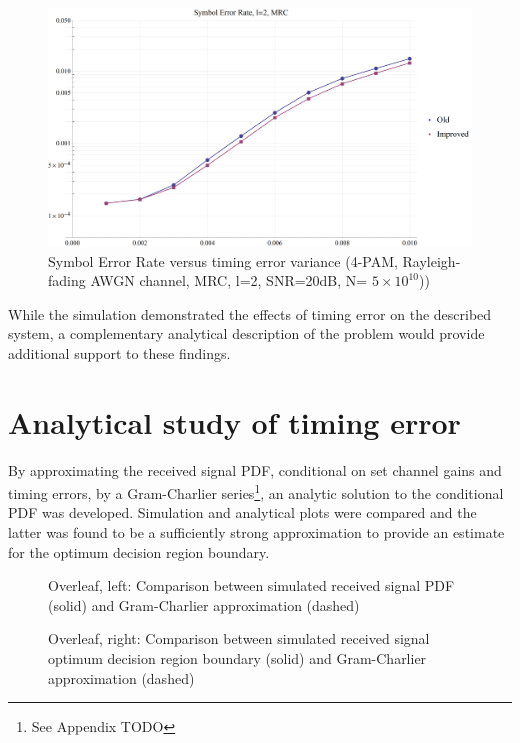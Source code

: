 \begin{figure}[htbp]
\centering
\includegraphics[width=\linewidth]{MRC2_SER.png}
\caption[MRC Symbol Error Rate]{Symbol Error Rate versus timing error variance (4-PAM, Rayleigh-fading AWGN channel, MRC, l=2, SNR=20dB, N= $5 \times 10^{10}$))}
\end{figure}

While the simulation demonstrated the effects of timing error on the described system, a complementary analytical description of the problem would provide additional support to these findings.

\section{Analytical study of timing error}

By approximating the received signal PDF, conditional on set channel gains and timing errors, by a Gram-Charlier series\footnote{See Appendix TODO}, an analytic solution to the conditional PDF was developed. Simulation and analytical plots were compared and the latter was found to be a sufficiently strong approximation to provide an estimate for the optimum decision region boundary.

\begin{figure}[htbp]
\caption[Received signal PDF: Gram-Charlier approximation vs simulation]{Overleaf, left: Comparison between simulated received signal PDF (solid) and Gram-Charlier approximation (dashed)}
\end{figure}

{
\setlength{\floatsep}{2pt plus 1.0pt minus 2.0pt}
\setlength{\textfloatsep}{2pt plus 1.0pt minus 2.0pt}
\setlength{\intextsep}{2pt plus 1.0pt minus 2.0pt}
\begin{figure}[htbp]
\caption[Received signal optimum DRB: Gram-Charlier approximation vs simulation]{Overleaf, right: Comparison between simulated received signal optimum decision region boundary (solid) and Gram-Charlier approximation (dashed)}
\end{figure}
}


